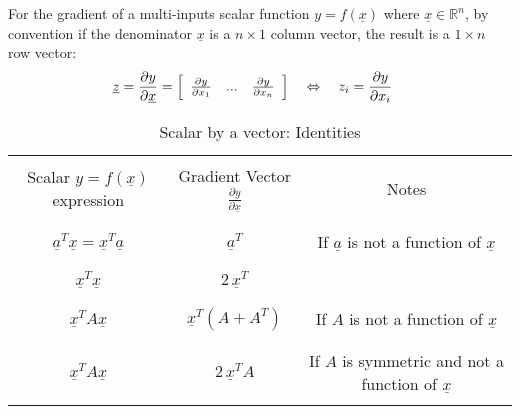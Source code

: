 For the gradient of a multi-inputs scalar function $y = f(\underline{x})$ where $\underline{x} \in \mathbb{R}^n$, by convention if the denominator $\underline{x}$ is a $n \times 1$ column vector, the result is a $1 \times n$ row vector:
\begin{align}
 \underline{z} = \frac{\partial y}{\partial \underline{x}} &=
 \left[ \begin{array}{c c c }
         \frac{\partial y}{\partial x_1}   & ... & \frac{\partial y}{\partial x_n}
 \end{array} \right]
 \quad \Leftrightarrow\quad
 z_i = \frac{\partial y}{\partial x_i}
\end{align}

\begin{table}[H]
 \centering
 \caption{ Scalar by a vector: Identities}
 \label{scavec}
 \begin{tabular}{ | c | c | c |}
  \hline \hline & & \\
  Scalar $y = f(\underline{x})$ expression & Gradient Vector $\frac{\partial y}{\partial \underline{x}}$  & Notes \\ & & \\
  \hline \hline & & \\
  $ \underline{a}^T \underline{x} = \underline{x}^T \underline{a} $ &
  $\underline{a}^T$ &   If $\underline{a}$ is not a function of $\underline{x}$
  \\ & & \\
  \hline & & \\
  $ \underline{x}^T \underline{x} $ &
  $ 2 \, \underline{x}^T $ &
  \\ & & \\
  \hline & & \\
  $ \underline{x}^T A \underline{x} $ &
  $\underline{x}^T ( A + A^T )$ &   If $A$ is not a function of $\underline{x}$
  \\ & & \\
  \hline & & \\
  $ \underline{x}^T A \underline{x} $ &
  $ 2\, \underline{x}^T A$ &   If $A$ is symmetric and not a function of $\underline{x}$
  \\ & & \\
  \hline
 \end{tabular}
\end{table}

